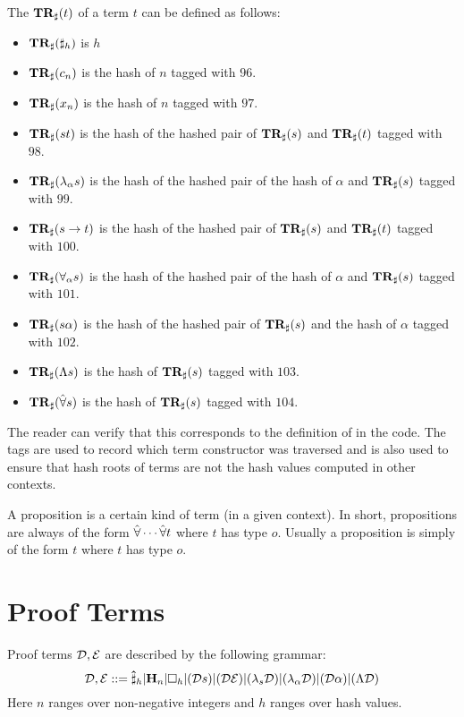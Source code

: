 The {} $\mathbf{TR}_{\sharp}(t)$ of a term $t$ can be defined as follows:
\begin{itemize}
\item $\mathbf{TR}_{\sharp}(\mathbf{\sharp}_{h})$ is $h$
\item $\mathbf{TR}_{\sharp}(c_n)$ is the hash of $n$ tagged with $96$.
\item $\mathbf{TR}_{\sharp}(x_n)$ is the hash of $n$ tagged with $97$.
\item $\mathbf{TR}_{\sharp}(st)$ is the hash of the hashed pair of $\mathbf{TR}_{\sharp}(s)$ and $\mathbf{TR}_{\sharp}(t)$ tagged with $98$.
\item $\mathbf{TR}_{\sharp}(\lambda_\alpha s)$ is the hash of the hashed pair of the hash of $\alpha$ and $\mathbf{TR}_{\sharp}(s)$ tagged with $99$.
\item $\mathbf{TR}_{\sharp}(s\to t)$ is the hash of the hashed pair of $\mathbf{TR}_{\sharp}(s)$ and $\mathbf{TR}_{\sharp}(t)$ tagged with $100$.
\item $\mathbf{TR}_{\sharp}(\forall_\alpha s)$ is the hash of the hashed pair of the hash of $\alpha$ and $\mathbf{TR}_{\sharp}(s)$ tagged with $101$.
\item $\mathbf{TR}_{\sharp}(s\alpha)$ is the hash of the hashed pair of $\mathbf{TR}_{\sharp}(s)$ and the hash of $\alpha$ tagged with $102$.
\item $\mathbf{TR}_{\sharp}(\Lambda s)$ is the hash of $\mathbf{TR}_{\sharp}(s)$ tagged with $103$.
\item $\mathbf{TR}_{\sharp}(\hat{\forall} s)$ is the hash of $\mathbf{TR}_{\sharp}(s)$ tagged with $104$.
\end{itemize}
The reader can verify that this corresponds to the
definition of {} in the code.
The tags are used to record which term constructor was
traversed and is also used to ensure that hash roots
of terms are not the hash values computed in other contexts.

A proposition is a certain kind of term (in a given context).
In short, propositions are always of the form
$\hat{\forall} \cdots \hat{\forall} t$
where $t$ has type $o$.
Usually a proposition is simply of the form
$t$ where $t$ has type $o$.

\section{Proof Terms}

Proof terms $\mathcal{D},\mathcal{E}$ are described by the following grammar:
$$
\mathcal{D},\mathcal{E} ::= \mathbf{\hat\sharp}_{h} | \mathbf{H}_{n} | \Box_{h} | (\mathcal{D} s) | (\mathcal{D} \mathcal{E}) | (\lambda_s \mathcal{D}) | (\lambda_\alpha \mathcal{D}) | (\mathcal{D} \alpha) | (\Lambda \mathcal{D})
$$
Here $n$ ranges over non-negative integers
and $h$ ranges over hash values.

